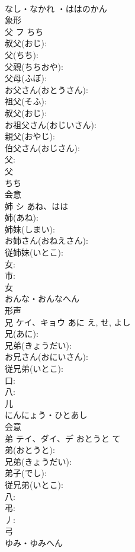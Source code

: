 \documentclass[8pt]{extreport}
\begin{document}
\begin{CJK}{UTF8}{min}
\\	なし・なかれ ・ははのかん	
\\	象形 
\\	父	フ	ちち		
\\	叔父(おじ): 
\\	父(ちち): 
\\	父親(ちちおや): 
\\	父母(ふぼ): 
\\	お父さん(おとうさん): 
\\	祖父(そふ): 
\\	叔父(おじ): 
\\	お祖父さん(おじいさん): 
\\	親父(おやじ): 
\\	伯父さん(おじさん): 
\\	父: 
\\	父	
\\	ちち	
\\	会意 
\\	姉	シ	あね、はは		
\\	姉(あね): 
\\	姉妹(しまい): 
\\	お姉さん(おねえさん): 
\\	従姉妹(いとこ): 
\\	女: 
\\	市: 
\\	女	
\\	おんな・おんなへん	
\\	形声 
\\	兄	ケイ、キョウ	あに	え, せ, よし	
\\	兄(あに): 
\\	兄弟(きょうだい): 
\\	お兄さん(おにいさん): 
\\	従兄弟(いとこ): 
\\	口: 
\\	八: 
\\	儿	
\\	にんにょう・ひとあし	
\\	会意 
\\	弟	テイ、ダイ、デ	おとうと	て	
\\	弟(おとうと): 
\\	兄弟(きょうだい): 
\\	弟子(でし): 
\\	従兄弟(いとこ): 
\\	八: 
\\	弔: 
\\	丿: 
\\	弓	
\\	ゆみ・ゆみへん	

\end{CJK}
\end{document}
